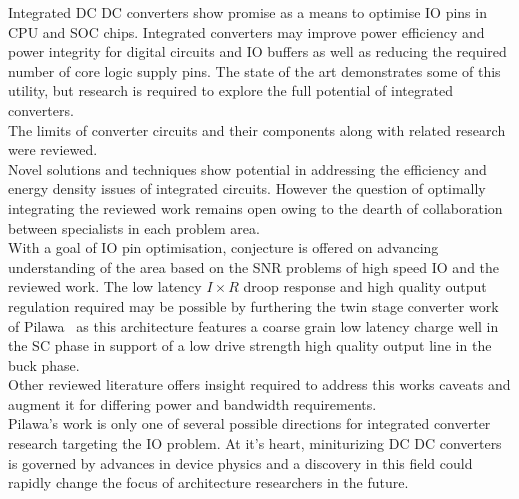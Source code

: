 \documentclass[letterpaper,twocolumn,10pt]{article}
\begin{document}
Integrated DC DC converters show promise as a means to optimise IO pins in CPU and SOC chips. Integrated converters may improve power efficiency and power integrity for digital circuits and IO buffers as well as reducing the required number of core logic supply pins. The state of the art demonstrates some of this utility, but research is required to explore the full potential of integrated converters.\\  
The limits of converter circuits and their components along with related research were reviewed.\\
Novel solutions and techniques show potential in addressing the efficiency and energy density issues of integrated circuits. However the question of optimally integrating the reviewed work remains open owing to the dearth of collaboration between specialists in each problem area.\\
\indent With a goal of IO pin optimisation, conjecture is offered on advancing understanding of the area based on the SNR problems of high speed IO and the reviewed work. The low latency $I \times R$ droop response and high quality output regulation required may be possible by furthering the twin stage converter work of Pilawa~\cite{Pilawa2012} as this architecture features a coarse grain low latency charge well in the SC phase in support of a low drive strength high quality output line in the buck phase.\\
Other reviewed literature offers insight required to address this works caveats and augment it for differing power and bandwidth requirements.\\
\indent Pilawa's work is only one of several possible directions for integrated converter research targeting the IO problem. At it's heart, miniturizing DC DC converters is governed by advances in device physics and a discovery in this field could rapidly change the focus of architecture researchers in the future.      


{\footnotesize 
}


\theendnotes
\end{document}
